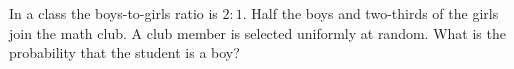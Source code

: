 In a class the boys-to-girls ratio is $2:1$. Half the boys and two-thirds of the girls join the math club. A club member is selected uniformly at random. What is the probability that the student is a boy?
